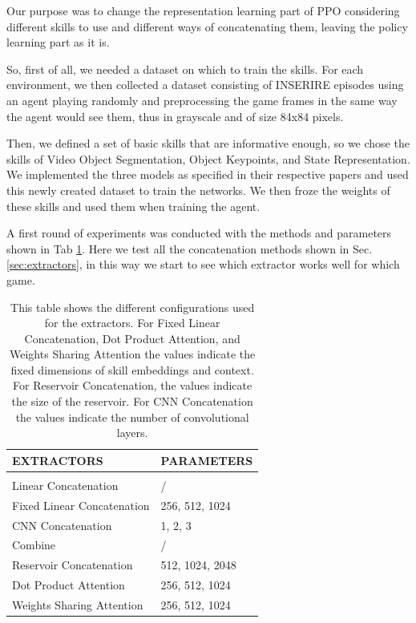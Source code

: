 Our purpose was to change the representation learning part of PPO considering different skills to use and different ways of concatenating them, leaving the policy learning part as it is.

So, first of all, we needed a dataset on which to train the skills. For each environment, we then collected a dataset consisting of INSERIRE episodes using an agent playing randomly and preprocessing the game frames in the same way the agent would see them, thus in grayscale and of size 84x84 pixels.

Then, we defined a set of basic skills that are informative enough, so we chose the skills of Video Object Segmentation, Object Keypoints, and State Representation.
We implemented the three models as specified in their respective papers and used this newly created dataset to train the networks.
We then froze the weights of these skills and used them when training the agent.

A first round of experiments was conducted with the methods and parameters shown in Tab \ref{tab:firstround}.
Here we test all the concatenation methods shown in Sec. \ref{sec:extractors}, in this way we start to see which extractor works well for which game.
\begin{table}[htbp]
    \begin{center}
        \begin{tabular}{ll}
            \multicolumn{1}{l}{EXTRACTORS}  &\multicolumn{1}{l}{\bf PARAMETERS}
            \\ \hline \\
            Linear Concatenation              &  / \\
            Fixed Linear Concatenation        & 256, 512, 1024 \\
            CNN Concatenation                 & 1, 2, 3 \\
            Combine                           & / \\
            Reservoir Concatenation           & 512, 1024, 2048 \\
            Dot Product Attention             & 256, 512, 1024 \\
            Weights Sharing Attention         & 256, 512, 1024 \\

        \end{tabular}
    \end{center}
    \caption{This table shows the different configurations used for the extractors. For Fixed Linear Concatenation, Dot Product Attention, and Weights Sharing Attention the values indicate the fixed dimensions of skill embeddings and context. For Reservoir Concatenation, the values indicate the size of the reservoir. For CNN Concatenation the values indicate the number of convolutional layers.}
    \label{tab:firstround}
\end{table}

